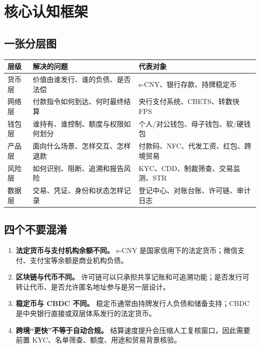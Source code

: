 \chapter{核心认知框架}\label{ux6838ux5fc3ux8ba4ux77e5ux6846ux67b6}

\section{一张分层图}\label{ux4e00ux5f20ux5206ux5c42ux56fe}

{\def\LTcaptype{none} %
\begin{longtable}[]{@{}lll@{}}
\toprule\noalign{}
层级 & 解决的问题 & 代表对象 \\
\midrule\noalign{}
\endhead
\bottomrule\noalign{}
\endlastfoot
货币层 & 价值由谁发行、谁的负债、是否法偿 & e-CNY、银行存款、持牌稳定币 \\
网络层 & 付款指令如何到达、何时最终结算 & 央行支付系统、CBETS、转数快 FPS \\
钱包层 & 谁持有、谁控制、额度与权限如何划分 &
个人/对公钱包、母子钱包、软/硬钱包 \\
产品层 & 面向什么场景、怎样交互、怎样退款 &
付款码、NFC、代发工资、红包、跨境贸易 \\
风险层 & 如何识别、阻断、追溯和报告风险 & KYC、CDD、制裁筛查、交易监测、STR \\
数据层 & 交易、凭证、身份和状态怎样记录 &
登记中心、对账台账、许可链、审计日志 \\
\end{longtable}
}

\section{四个不要混淆}\label{ux56dbux4e2aux4e0dux8981ux6df7ux6dc6}

\begin{enumerate}
\def\labelenumi{\arabic{enumi}.}
\tightlist
\item
  \textbf{法定货币与支付机构余额不同。} e-CNY
  是国家信用下的法定货币；微信支付、支付宝等余额是商业机构负债。
\item
  \textbf{区块链与代币不同。}
  许可链可以只承担共享记账和可追溯功能；是否发行可转让代币、是否允许匿名地址参与是另一层设计。
\item
  \textbf{稳定币与 CBDC 不同。} 稳定币通常由持牌发行人负债和储备支持；CBDC
  是中央银行直接或双层体系发行的法定货币。
\item
  \textbf{跨境``更快''不等于自动合规。}
  结算速度提升会压缩人工复核窗口，因此需要前置
  KYC、名单筛查、额度、用途和贸易背景核验。
\end{enumerate}

